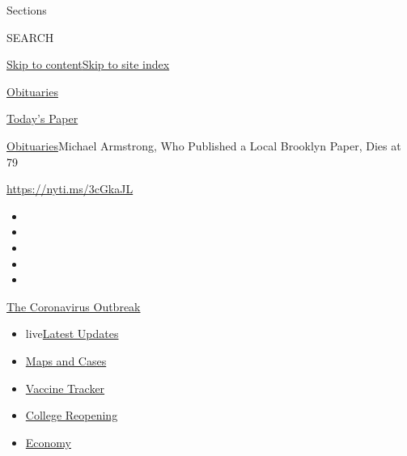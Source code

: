 Sections

SEARCH

\protect\hyperlink{site-content}{Skip to
content}\protect\hyperlink{site-index}{Skip to site index}

\href{https://www.nytimes3xbfgragh.onion/section/obituaries}{Obituaries}

\href{https://myaccount.nytimes3xbfgragh.onion/auth/login?response_type=cookie\&client_id=vi}{}

\href{https://www.nytimes3xbfgragh.onion/section/todayspaper}{Today's
Paper}

\href{/section/obituaries}{Obituaries}\textbar{}Michael Armstrong, Who
Published a Local Brooklyn Paper, Dies at 79

\url{https://nyti.ms/3cGkaJL}

\begin{itemize}
\item
\item
\item
\item
\item
\end{itemize}

\href{https://www.nytimes3xbfgragh.onion/news-event/coronavirus?action=click\&pgtype=Article\&state=default\&region=TOP_BANNER\&context=storylines_menu}{The
Coronavirus Outbreak}

\begin{itemize}
\tightlist
\item
  live\href{https://www.nytimes3xbfgragh.onion/2020/08/04/world/coronavirus-covid-19.html?action=click\&pgtype=Article\&state=default\&region=TOP_BANNER\&context=storylines_menu}{Latest
  Updates}
\item
  \href{https://www.nytimes3xbfgragh.onion/interactive/2020/us/coronavirus-us-cases.html?action=click\&pgtype=Article\&state=default\&region=TOP_BANNER\&context=storylines_menu}{Maps
  and Cases}
\item
  \href{https://www.nytimes3xbfgragh.onion/interactive/2020/science/coronavirus-vaccine-tracker.html?action=click\&pgtype=Article\&state=default\&region=TOP_BANNER\&context=storylines_menu}{Vaccine
  Tracker}
\item
  \href{https://www.nytimes3xbfgragh.onion/2020/08/02/us/covid-college-reopening.html?action=click\&pgtype=Article\&state=default\&region=TOP_BANNER\&context=storylines_menu}{College
  Reopening}
\item
  \href{https://www.nytimes3xbfgragh.onion/live/2020/08/03/business/stock-market-today-coronavirus?action=click\&pgtype=Article\&state=default\&region=TOP_BANNER\&context=storylines_menu}{Economy}
\end{itemize}

